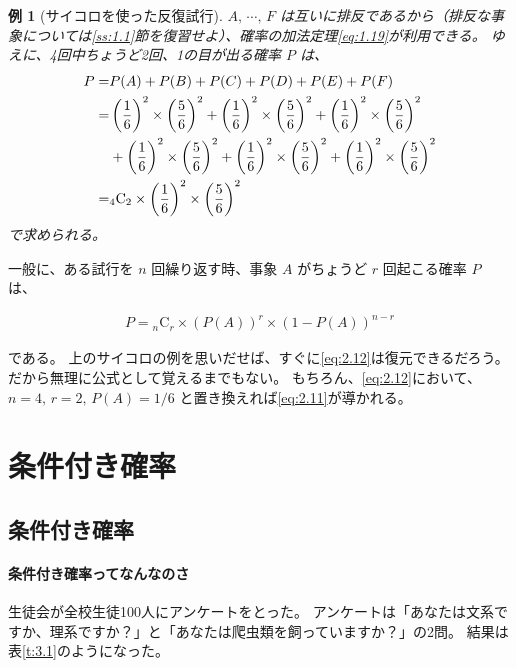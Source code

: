 \documentclass[12pt]{ltjsarticle}\usepackage{ifthen}\newcounter{enlarge}\setcounter{enlarge}{1}
\newtheorem{eg}{例}
\begin{document}
\begin{eg}[サイコロを使った反復試行]
    $A,\, \cdots,\, F$ は互いに排反であるから（排反な事象については\ref{ss:1.1}節を復習せよ）、確率の加法定理\eqref{eq:1.19}が利用できる。
    ゆえに、4回中ちょうど2回、1の目が出る確率 $P$ は、
    \begin{align}
      P =& P(A) + P(B) + P(C) + P(D) + P(E) + P(F) \notag \\
      =& \left( \frac{1}{6} \right)^2 \times \left( \frac{5}{6} \right)^2 + \left( \frac{1}{6} \right)^2 \times \left( \frac{5}{6} \right)^2 + \left( \frac{1}{6} \right)^2 \times \left( \frac{5}{6} \right)^2 \notag \\
         &+ \left( \frac{1}{6} \right)^2 \times \left( \frac{5}{6} \right)^2 + \left( \frac{1}{6} \right)^2 \times \left( \frac{5}{6} \right)^2 + \left( \frac{1}{6} \right)^2 \times \left( \frac{5}{6} \right)^2 \notag \\
        =& {}_4 \mathrm{C}_2 \times \left( \frac{1}{6} \right)^2 \times \left( \frac{5}{6} \right)^2 \label{eq:2.11}
    \end{align}
    で求められる。    
\end{eg}

一般に、ある試行を $n$ 回繰り返す時、事象 $A$ がちょうど $r$ 回起こる確率 $P$ は、
\begin{oframed}
  \begin{align}
     P = {}_n \mathrm{C}_r \times \left( P(A) \right)^r \times \left( 1 - P(A) \right)^{n-r}  \label{eq:2.12}
  \end{align}
\end{oframed}
\noindent
である。
上のサイコロの例を思いだせば、すぐに\eqref{eq:2.12}は復元できるだろう。
だから無理に公式として覚えるまでもない。
もちろん、\eqref{eq:2.12}において、$n = 4,\, r = 2,\, P(A) = 1/6$ と置き換えれば\eqref{eq:2.11}が導かれる。

\section{条件付き確率}

\subsection{条件付き確率} \label{ss:3.1}

\paragraph{条件付き確率ってなんなのさ}

生徒会が全校生徒100人にアンケートをとった。
アンケートは「あなたは文系ですか、理系ですか？」と「あなたは爬虫類を飼っていますか？」の2問。
結果は表\ref{t:3.1}のようになった。
\end{document}
